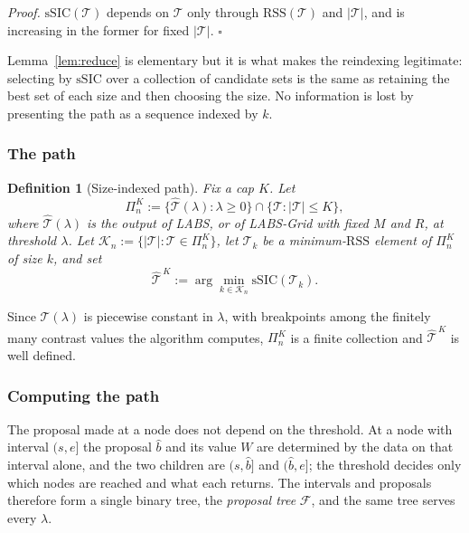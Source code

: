 \documentclass[12pt, a4paper]{article}
\newcommand{\qed}{\hfill$\square$}
\newenvironment{proof}[1][Proof]{\par\noindent\textit{#1.}\space}{\qed\par\medskip}
\newtheorem{defin}{Definition}[section]
\begin{document}
\begin{proof}
$\mathrm{sSIC}(\mathcal{T})$ depends on $\mathcal{T}$ only through
$\mathrm{RSS}(\mathcal{T})$ and $|\mathcal{T}|$, and is increasing in the
former for fixed $|\mathcal{T}|$.
\end{proof}

Lemma~\ref{lem:reduce} is elementary but it is what makes the reindexing
legitimate: selecting by $\mathrm{sSIC}$ over a collection of candidate sets is
the same as retaining the best set of each size and then choosing the size. No
information is lost by presenting the path as a sequence indexed by $k$.

\subsubsection*{The path}

\begin{defin}[Size-indexed path]
\label{def:sizepath}
Fix a cap $K$. Let
\[
\Pi_n^{K} := \big\{ \hat{\mathcal{T}}(\lambda) : \lambda \ge 0 \big\}
\cap \big\{ \mathcal{T} : |\mathcal{T}| \le K \big\},
\]
where $\hat{\mathcal{T}}(\lambda)$ is the output of LABS, or of LABS-Grid with
fixed $M$ and $R$, at threshold $\lambda$. Let $\mathcal{K}_n :=
\{|\mathcal{T}| : \mathcal{T} \in \Pi_n^K\}$, let $\mathcal{T}_k$ be a
minimum-$\mathrm{RSS}$ element of $\Pi_n^K$ of size $k$, and set
\[
\hat{\mathcal{T}}^{\,K} := \arg\min_{k \in \mathcal{K}_n}
\mathrm{sSIC}(\mathcal{T}_k) .
\]
\end{defin}

Since $\hat{\mathcal{T}}(\lambda)$ is piecewise constant in $\lambda$, with
breakpoints among the finitely many contrast values the algorithm computes,
$\Pi_n^K$ is a finite collection and $\hat{\mathcal{T}}^{\,K}$ is well defined.

\subsubsection*{Computing the path}

The proposal made at a node does not depend on the threshold. At a node with
interval $(s,e]$ the proposal $\hat b$ and its value $W$ are determined by the
data on that interval alone, and the two children are $(s,\hat b]$ and
$(\hat b,e]$; the threshold decides only which nodes are reached and what each
returns. The intervals and proposals therefore form a single binary tree, the
\emph{proposal tree} $\mathcal{F}$, and the same tree serves every $\lambda$.
\end{document}
